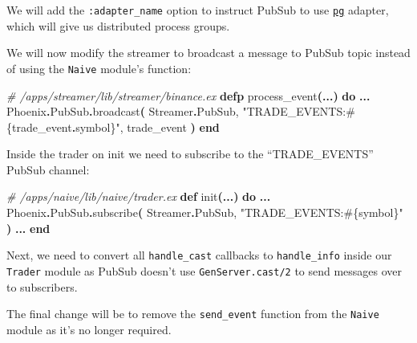 \documentclass[
  oneside]{book}
\newenvironment{Shaded}{\begin{snugshade}}{\end{snugshade}}
\newcommand{\CommentTok}[1]{\textcolor[rgb]{0.56,0.35,0.01}{\textit{#1}}}
\newcommand{\ConstantTok}[1]{\textcolor[rgb]{0.56,0.35,0.01}{#1}}
\newcommand{\FunctionTok}[1]{\textcolor[rgb]{0.13,0.29,0.53}{\textbf{#1}}}
\newcommand{\KeywordTok}[1]{\textcolor[rgb]{0.13,0.29,0.53}{\textbf{#1}}}
\newcommand{\NormalTok}[1]{#1}
\newcommand{\OperatorTok}[1]{\textcolor[rgb]{0.81,0.36,0.00}{\textbf{#1}}}
\newcommand{\OtherTok}[1]{\textcolor[rgb]{0.56,0.35,0.01}{#1}}
\newcommand{\StringTok}[1]{\textcolor[rgb]{0.31,0.60,0.02}{#1}}
\begin{document}
We will add the \texttt{:adapter\_name} option to instruct PubSub to use \href{http://erlang.org/doc/man/pg.html}{\texttt{pg}} adapter, which will give us distributed process groups.

We will now modify the streamer to broadcast a message to PubSub topic instead of using the \texttt{Naive} module's function:

\begin{Shaded}
\begin{Highlighting}[]
\CommentTok{\# /apps/streamer/lib/streamer/binance.ex}
  \KeywordTok{defp}\NormalTok{ process\_event}\FunctionTok{(}\OperatorTok{...}\FunctionTok{)} \KeywordTok{do}
    \OperatorTok{...}
    \ConstantTok{Phoenix}\OperatorTok{.}\ConstantTok{PubSub}\OperatorTok{.}\NormalTok{broadcast}\FunctionTok{(}
      \ConstantTok{Streamer}\OperatorTok{.}\ConstantTok{PubSub}\NormalTok{,}
      \StringTok{"TRADE\_EVENTS:}\OtherTok{\#\{}\NormalTok{trade\_event}\OperatorTok{.}\NormalTok{symbol}\OtherTok{\}}\StringTok{"}\NormalTok{,}
\NormalTok{      trade\_event}
    \FunctionTok{)}
  \KeywordTok{end}
\end{Highlighting}
\end{Shaded}

\newpage

Inside the trader on init we need to subscribe to the ``TRADE\_EVENTS'' PubSub channel:

\begin{Shaded}
\begin{Highlighting}[]
\CommentTok{\# /apps/naive/lib/naive/trader.ex}
  \KeywordTok{def}\NormalTok{ init}\FunctionTok{(}\OperatorTok{...}\FunctionTok{)} \KeywordTok{do}
    \OperatorTok{...}
    \ConstantTok{Phoenix}\OperatorTok{.}\ConstantTok{PubSub}\OperatorTok{.}\NormalTok{subscribe}\FunctionTok{(}
      \ConstantTok{Streamer}\OperatorTok{.}\ConstantTok{PubSub}\NormalTok{,}
      \StringTok{"TRADE\_EVENTS:}\OtherTok{\#\{}\NormalTok{symbol}\OtherTok{\}}\StringTok{"}
    \FunctionTok{)}
    \OperatorTok{...}
  \KeywordTok{end}
\end{Highlighting}
\end{Shaded}

Next, we need to convert all \texttt{handle\_cast} callbacks to \texttt{handle\_info} inside our \texttt{Trader} module as PubSub doesn't use \texttt{GenServer.cast/2} to send messages over to subscribers.

The final change will be to remove the \texttt{send\_event} function from the \texttt{Naive}
module as it's no longer required.
\end{document}
